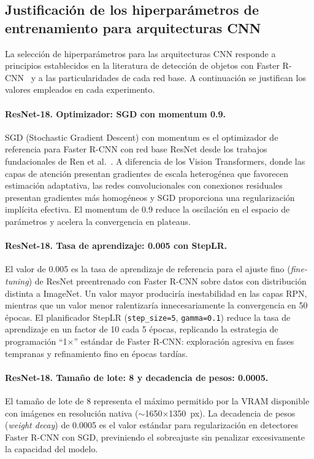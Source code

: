 \subsection{Justificación de los hiperparámetros de entrenamiento para arquitecturas CNN}
\label{subsec:justificacion_hiperparametros_cnn}

La selección de hiperparámetros para las arquitecturas CNN responde a principios establecidos en la literatura de detección de objetos con Faster R-CNN~\cite{ren_faster_2016} y a las particularidades de cada red base. A continuación se justifican los valores empleados en cada experimento.

\paragraph{ResNet-18. Optimizador: SGD con momentum 0.9.}
SGD (Stochastic Gradient Descent) con momentum es el optimizador de referencia para Faster R-CNN con red base ResNet desde los trabajos fundacionales de Ren et al.~\cite{ren_faster_2016}. A diferencia de los Vision Transformers, donde las capas de atención presentan gradientes de escala heterogénea que favorecen estimación adaptativa, las redes convolucionales con conexiones residuales presentan gradientes más homogéneos y SGD proporciona una regularización implícita efectiva. El momentum de 0.9 reduce la oscilación en el espacio de parámetros y acelera la convergencia en plateaus.

\paragraph{ResNet-18. Tasa de aprendizaje: 0.005 con StepLR.}
El valor de 0.005 es la tasa de aprendizaje de referencia para el ajuste fino (\textit{fine-tuning}) de ResNet preentrenado con Faster R-CNN sobre datos con distribución distinta a ImageNet. Un valor mayor produciría inestabilidad en las capas RPN, mientras que un valor menor ralentizaría innecesariamente la convergencia en 50 épocas. El planificador StepLR (\texttt{step\_size=5}, \texttt{gamma=0.1}) reduce la tasa de aprendizaje en un factor de 10 cada 5 épocas, replicando la estrategia de programación ``1$\times$'' estándar de Faster R-CNN: exploración agresiva en fases tempranas y refinamiento fino en épocas tardías.

\paragraph{ResNet-18. Tamaño de lote: 8 y decadencia de pesos: 0.0005.}
El tamaño de lote de 8 representa el máximo permitido por la VRAM disponible con imágenes en resolución nativa ($\sim$1650$\times$1350~px). La decadencia de pesos (\textit{weight decay}) de 0.0005 es el valor estándar para regularización en detectores Faster R-CNN con SGD, previniendo el sobreajuste sin penalizar excesivamente la capacidad del modelo.

